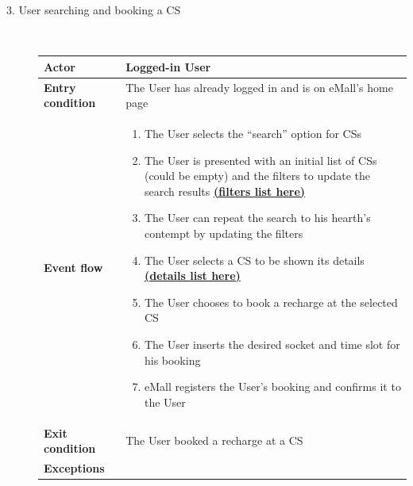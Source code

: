 \documentclass[11pt]{article}
\begin{document}
\begin{description}
    \newpage
    
    \item [3. User searching and booking a CS] \hfill \\
    \begin{table}[H]
        \centering
        \setlength{\tabcolsep}{18pt}
        \renewcommand{\arraystretch}{1.4}
        \begin{tabularx}{\textwidth}{|>{\hsize=0.5\hsize}X|>{\hsize=1.5\hsize}X|}
            \hline
            \textbf{Actor} & Logged-in User \\
            \hline
            \textbf{Entry condition} & The User has already logged in and is on eMall's home page \\
            \hline
            \textbf{Event flow} & 
                \begin{minipage}[t]{\hsize}
                \begin{enumerate}[topsep=0pt, leftmargin=*]
                    \item The User selects the “search” option for CSs  
                    \item The User is presented with an initial list of CSs (could be empty) and the filters to update the search results \hyperref[scenario:lookingForCS]{\textbf{(filters list here)}}
                    \item The User can repeat the search to his hearth's contempt by updating the filters
                    \item The User selects a CS to be shown its details \hyperref[scenario:lookingForCS]{\textbf{(details list here)}}
                    \item The User chooses to book a recharge at the selected CS
                    \item The User inserts the desired socket and time slot for his booking
                    \item eMall registers the User's booking and confirms it to the User
                \end{enumerate}
                \end{minipage}
                \vspace{6pt}
            \\
            \hline
            \textbf{Exit condition} & The User booked a recharge at a CS \\
            \hline
            \textbf{Exceptions} & 
                \begin{minipage}[t]{\hsize}

\end{minipage}
\end{tabularx}
\end{table}
\end{description}
\end{document}
